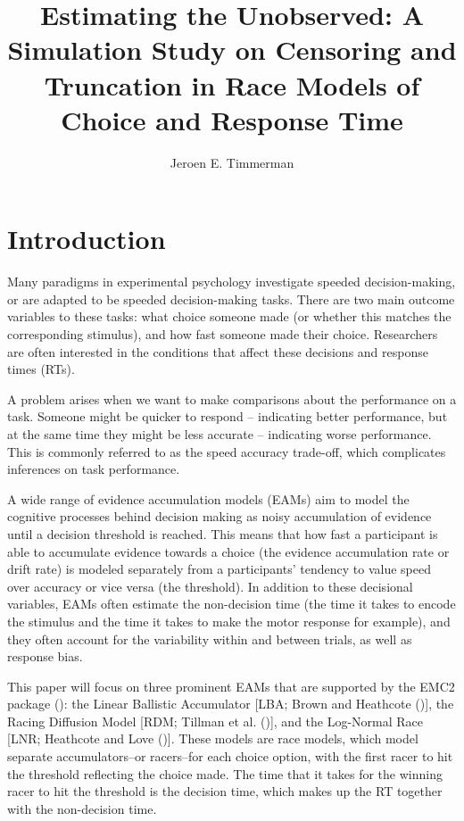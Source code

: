 \documentclass[
  stu,
  floatsintext,
  longtable,
  nolmodern,
  notxfonts,
  notimes,
  draftfirst,
  colorlinks=true,linkcolor=blue,citecolor=blue,urlcolor=blue]{apa7}
\title{Estimating the Unobserved: A Simulation Study on Censoring and
Truncation in Race Models of Choice and Response Time}
\author{Jeroen E. Timmerman}
\affiliation{
{Department of Psychology, University of Amsterdam}}
\begin{document}
\maketitle


\setcounter{secnumdepth}{-\maxdimen} %

\setlength\LTleft{0pt}


\section{Introduction}\label{introduction}

Many paradigms in experimental psychology investigate speeded
decision-making, or are adapted to be speeded decision-making tasks.
There are two main outcome variables to these tasks: what choice someone
made (or whether this matches the corresponding stimulus), and how fast
someone made their choice. Researchers are often interested in the
conditions that affect these decisions and response times (RTs).

A problem arises when we want to make comparisons about the performance
on a task. Someone might be quicker to respond -- indicating better
performance, but at the same time they might be less accurate --
indicating worse performance. This is commonly referred to as the speed
accuracy trade-off, which complicates inferences on task performance.

A wide range of evidence accumulation models (EAMs) aim to model the
cognitive processes behind decision making as noisy accumulation of
evidence until a decision threshold is reached. This means that how fast
a participant is able to accumulate evidence towards a choice (the
evidence accumulation rate or drift rate) is modeled separately from a
participants' tendency to value speed over accuracy or vice versa (the
threshold). In addition to these decisional variables, EAMs often
estimate the non-decision time (the time it takes to encode the stimulus
and the time it takes to make the motor response for example), and they
often account for the variability within and between trials, as well as
response bias.

This paper will focus on three prominent EAMs that are supported by the
EMC2 package (): the Linear
Ballistic Accumulator {[}LBA; Brown and Heathcote
(){]}, the Racing Diffusion Model {[}RDM;
Tillman et al. (){]}, and the Log-Normal Race
{[}LNR; Heathcote and Love (){]}. These models
are race models, which model separate accumulators--or racers--for each
choice option, with the first racer to hit the threshold reflecting the
choice made. The time that it takes for the winning racer to hit the
threshold is the decision time, which makes up the RT together with the
non-decision time.
\end{document}
